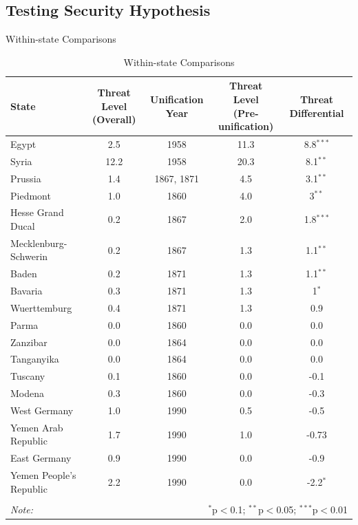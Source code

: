 \documentclass{beamer}
\begin{document}
	\subsection{Testing Security Hypothesis}
	\begin{frame}{Within-state Comparisons}
		\begin{table}
			\centering
			\caption{Within-state Comparisons}
			\tiny
			\begin{tabular}{lcccc}
				\toprule
				State & \makecell{Threat Level \\ (Overall)} & Unification Year & \makecell{Threat Level \\ (Pre-unification)} & Threat Differential \\
				\midrule
				Egypt & 2.5 & 1958 & 11.3 & 8.8$^{***}$ \\
				Syria & 12.2 & 1958 & 20.3 & 8.1$^{**}$ \\
				Prussia & 1.4 & 1867, 1871 & 4.5 & 3.1$^{**}$ \\
				Piedmont & 1.0 & 1860 & 4.0 & 3$^{**}$ \\
				Hesse Grand Ducal & 0.2 & 1867 & 2.0 & 1.8$^{***}$ \\
				Mecklenburg-Schwerin & 0.2 & 1867 & 1.3 & 1.1$^{**}$ \\
				Baden & 0.2 & 1871 & 1.3 & 1.1$^{**}$ \\
				Bavaria & 0.3 & 1871 & 1.3 & 1$^{*}$ \\
				Wuerttemburg & 0.4 & 1871 & 1.3 & 0.9 \\
				
				Parma & 0.0 & 1860 & 0.0 & 0.0 \\
				Zanzibar & 0.0 & 1864 & 0.0 & 0.0 \\
				Tanganyika & 0.0 & 1864 & 0.0 & 0.0 \\
				Tuscany & 0.1 & 1860 & 0.0 & -0.1 \\
				Modena & 0.3 & 1860 & 0.0 & -0.3 \\
				West Germany & 1.0 & 1990 & 0.5 & -0.5 \\
				Yemen Arab Republic & 1.7 & 1990 & 1.0 & -0.73 \\
				East Germany & 0.9 & 1990 & 0.0 & -0.9 \\
				Yemen People's Republic & 2.2 & 1990 & 0.0 & -2.2$^{*}$ \\
				\bottomrule
				\\[-1.8ex] 
				\textit{Note:} & \multicolumn{4}{r}{$^{*}$p$<$0.1; $^{**}$p$<$0.05; $^{***}$p$<$0.01} \\
			\end{tabular}
		\end{table}
	\end{frame}
\end{document}
